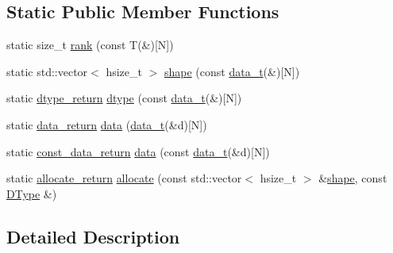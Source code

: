 \subsection*{Static Public Member Functions}
\begin{DoxyCompactItemize}
\item 
static size\-\_\-t \hyperlink{struct_h5_t_l_1_1adapt_3_01_t[_n]_4_a1e14071b925ce567cdd9b0a5ed288602}{rank} (const T(\&)\mbox{[}N\mbox{]})
\item 
static std\-::vector$<$ hsize\-\_\-t $>$ \hyperlink{struct_h5_t_l_1_1adapt_3_01_t[_n]_4_a47dc98415bf3fc9b68b1e41b38ca9d52}{shape} (const \hyperlink{struct_h5_t_l_1_1adapt_3_01_t[_n]_4_af9933a1521aecd615759226aab22fc60}{data\-\_\-t}(\&)\mbox{[}N\mbox{]})
\item 
static \hyperlink{struct_h5_t_l_1_1adapt_3_01_t[_n]_4_a796cb13cf8219e0bef087b366e33be18}{dtype\-\_\-return} \hyperlink{struct_h5_t_l_1_1adapt_3_01_t[_n]_4_adf210aa39b76e30fa5fb4db106666fee}{dtype} (const \hyperlink{struct_h5_t_l_1_1adapt_3_01_t[_n]_4_af9933a1521aecd615759226aab22fc60}{data\-\_\-t}(\&)\mbox{[}N\mbox{]})
\item 
static \hyperlink{struct_h5_t_l_1_1adapt_3_01_t[_n]_4_a255473fbedaa64738ad99c1b2b4e9f33}{data\-\_\-return} \hyperlink{struct_h5_t_l_1_1adapt_3_01_t[_n]_4_a5224263ba47fa032c8e8f7ac646738e9}{data} (\hyperlink{struct_h5_t_l_1_1adapt_3_01_t[_n]_4_af9933a1521aecd615759226aab22fc60}{data\-\_\-t}(\&d)\mbox{[}N\mbox{]})
\item 
static \hyperlink{struct_h5_t_l_1_1adapt_3_01_t[_n]_4_aa26ab555a2c6ae40181e9212b292e3df}{const\-\_\-data\-\_\-return} \hyperlink{struct_h5_t_l_1_1adapt_3_01_t[_n]_4_a6ca8f803e7355cf927cf6b08ba2d8a75}{data} (const \hyperlink{struct_h5_t_l_1_1adapt_3_01_t[_n]_4_af9933a1521aecd615759226aab22fc60}{data\-\_\-t}(\&d)\mbox{[}N\mbox{]})
\item 
static \hyperlink{struct_h5_t_l_1_1adapt_3_01_t[_n]_4_a0b70e9265935053f7cd15dd9ae47b5e9}{allocate\-\_\-return} \hyperlink{struct_h5_t_l_1_1adapt_3_01_t[_n]_4_a167ed6330f6386313487fc935ddbecf4}{allocate} (const std\-::vector$<$ hsize\-\_\-t $>$ \&\hyperlink{struct_h5_t_l_1_1adapt_3_01_t[_n]_4_a47dc98415bf3fc9b68b1e41b38ca9d52}{shape}, const \hyperlink{class_h5_t_l_1_1_d_type}{D\-Type} \&)
\end{DoxyCompactItemize}


\subsection{Detailed Description}
